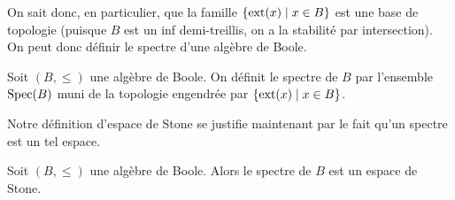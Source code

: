 On sait donc, en particulier, que la famille $\{\operatorname{ext}(x)\mid x\in B\}$ est une
base de topologie (puisque $B$ est un inf demi-treillis, on a la stabilité par
intersection). On peut donc définir le spectre d'une algèbre de Boole.

\begin{definition}
  Soit $(B,\leq)$ une algèbre de Boole. On définit le spectre de $B$ par
  l'ensemble $\operatorname{Spec}(B)$ muni de la topologie engendrée par
  $\{\operatorname{ext}(x)\mid x \in B\}$.
\end{definition}

Notre définition d'espace de Stone se justifie maintenant par le fait qu'un
spectre est un tel espace.

\begin{property}
  Soit $(B,\leq)$ une algèbre de Boole. Alors le spectre de $B$ est un espace de
  Stone.
\end{property}

